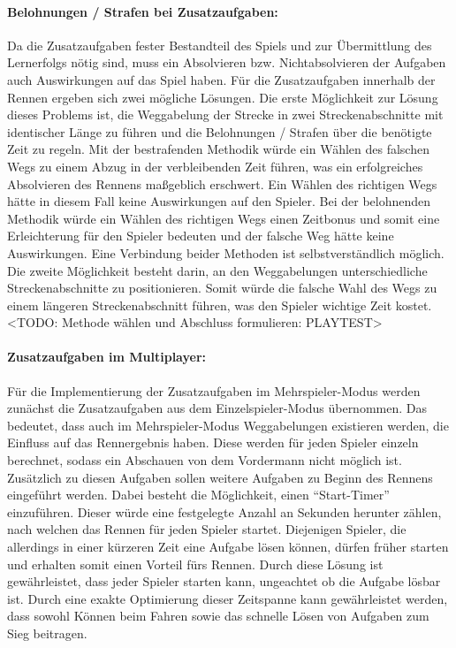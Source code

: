		\paragraph{Belohnungen / Strafen bei Zusatzaufgaben:}
		Da die Zusatzaufgaben fester Bestandteil des Spiels und zur Übermittlung des Lernerfolgs nötig sind, muss ein Absolvieren bzw. Nichtabsolvieren der Aufgaben auch Auswirkungen auf das Spiel haben. Für die Zusatzaufgaben innerhalb der Rennen ergeben sich zwei mögliche Lösungen.
		Die erste Möglichkeit zur Lösung dieses Problems ist, die Weggabelung der Strecke in zwei Streckenabschnitte mit identischer Länge zu führen und die Belohnungen / Strafen über die benötigte Zeit zu regeln. Mit der bestrafenden Methodik würde ein Wählen des falschen Wegs zu einem Abzug in der verbleibenden Zeit führen, was ein erfolgreiches Absolvieren des Rennens maßgeblich erschwert. Ein Wählen des richtigen Wegs hätte in diesem Fall keine Auswirkungen auf den Spieler.
		Bei der belohnenden Methodik würde ein Wählen des richtigen Wegs einen Zeitbonus und somit eine Erleichterung für den Spieler bedeuten und der falsche Weg hätte keine Auswirkungen. Eine Verbindung beider Methoden ist selbstverständlich möglich.
		Die zweite Möglichkeit besteht darin, an den Weggabelungen unterschiedliche Streckenabschnitte zu positionieren. Somit würde die falsche Wahl des Wegs zu einem längeren Streckenabschnitt führen, was den Spieler wichtige Zeit kostet.
		<TODO: Methode wählen und Abschluss formulieren: PLAYTEST>

		\paragraph{Zusatzaufgaben im Multiplayer:}
		Für die Implementierung der Zusatzaufgaben im Mehrspieler-Modus werden zunächst die Zusatzaufgaben aus dem Einzelspieler-Modus übernommen. Das bedeutet, dass auch im Mehrspieler-Modus Weggabelungen existieren werden, die Einfluss auf das Rennergebnis haben. Diese werden für jeden Spieler einzeln berechnet, sodass ein Abschauen von dem Vordermann nicht möglich ist. Zusätzlich zu diesen Aufgaben sollen weitere Aufgaben zu Beginn des Rennens eingeführt werden. Dabei besteht die Möglichkeit, einen \enquote{Start-Timer} einzuführen. Dieser würde eine festgelegte Anzahl an Sekunden herunter zählen, nach welchen das Rennen für jeden Spieler startet. Diejenigen Spieler, die allerdings in einer kürzeren Zeit eine Aufgabe lösen können, dürfen früher starten und erhalten somit einen Vorteil fürs Rennen.
		Durch diese Lösung ist gewährleistet, dass jeder Spieler starten kann, ungeachtet ob die Aufgabe lösbar ist. Durch eine exakte Optimierung dieser Zeitspanne kann gewährleistet werden, dass sowohl Können beim Fahren sowie das schnelle Lösen von Aufgaben zum Sieg beitragen.

